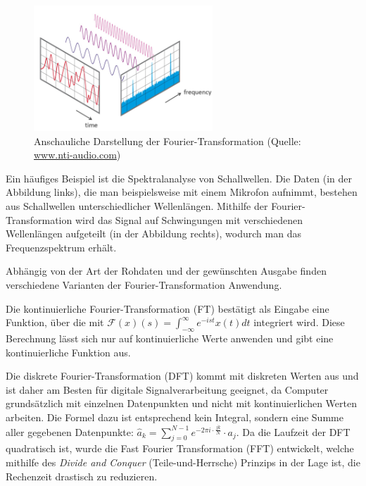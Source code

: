 \documentclass[]{dsadokumentation}
\begin{document}

\begin{figure}
  \centering
  \includegraphics[width=0.6\textwidth]{k4.2/fourier.png}
  \caption{Anschauliche Darstellung der Fourier-Transformation (Quelle: \url{www.nti-audio.com})}
\end{figure}

Ein häufiges Beispiel ist die Spektralanalyse von Schallwellen. Die Daten (in der Abbildung links), die man beispielsweise mit einem Mikrofon aufnimmt, bestehen aus Schallwellen unterschiedlicher Wellenlängen. Mithilfe der Fourier-Transformation wird das Signal auf Schwingungen mit verschiedenen Wellenl\"angen aufgeteilt (in der Abbildung rechts), wodurch man das Frequenzspektrum erhält.

Abhängig von der Art der Rohdaten und der gewünschten Ausgabe finden verschiedene Varianten der Fourier-Transformation Anwendung.

Die kontinuierliche Fourier-Transformation (FT) bestätigt als Eingabe eine Funktion, über die mit $\mathcal{F}(x)(s)=\int_{-\infty}^{\infty}e^{-ist}x(t)dt$ integriert wird. Diese Berechnung lässt sich nur auf kontinuierliche Werte anwenden und gibt eine kontinuierliche Funktion aus.

Die diskrete Fourier-Transformation (DFT) kommt mit diskreten Werten aus und ist daher am Besten für digitale Signalverarbeitung geeignet, da Computer grundsätzlich mit einzelnen Datenpunkten und nicht mit kontinuierlichen Werten arbeiten. Die Formel dazu ist entsprechend kein Integral, sondern eine Summe aller gegebenen Datenpunkte: $\hat a_k = \sum\limits_{j=0}^{N-1}e^{-2\pi i\cdot\frac{jk}{N}}\cdot a_j$. Da die Laufzeit der DFT quadratisch ist, wurde die Fast Fourier Transformation (FFT) entwickelt, welche mithilfe des \emph{Divide and Conquer} (Teile-und-Herrsche) Prinzips in der Lage ist, die Rechenzeit drastisch zu reduzieren.
\end{document}
